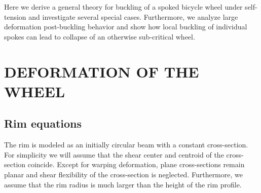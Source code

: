 \documentclass{bmd2016p}
\begin{document}
Here we derive a general theory for buckling of a spoked bicycle wheel under self-tension and investigate several special cases. Furthermore, we analyze large deformation post-buckling behavior and show how local buckling of individual spokes can lead to collapse of an otherwise sub-critical wheel.





\section{DEFORMATION OF THE WHEEL}
\subsection{Rim equations}

The rim is modeled as an initially circular beam with a constant cross-section. For simplicity we will assume that the shear center and centroid of the cross-section coincide. Except for warping deformation, plane cross-sections remain planar and shear flexibility of the cross-section is neglected. Furthermore, we assume that the rim radius is much larger than the height of the rim profile.
\end{document}
